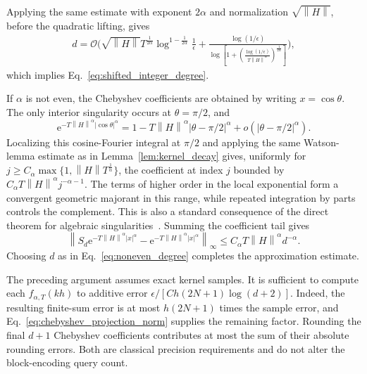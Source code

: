 \documentclass[aps,pra,reprint,floatfix,unsortedaddress,superscriptaddress]{revtex4-2}
\newcommand{\norm}[1]{\left\lVert#1\right\rVert}
\newcommand{\abs}[1]{\left\lvert#1\right\rvert}
\newcommand{\Ocal}{\mathcal{O}}
\begin{document}
Applying the same estimate with exponent $2\alpha$ and normalization
$\sqrt{\norm{H}}$, before the quadratic lifting, gives
\begin{equation}
\begin{split}
d=\Ocal\!\Bigg(
\sqrt{\norm{H}}T^{\frac{1}{2\alpha}}
\log^{1-\frac{1}{2\alpha}}\frac{1}{\epsilon}
+\frac{\log(1/\epsilon)}{
\log\!\left[
1+
\left(
\frac{\log(1/\epsilon)}{T\norm{H}^{\alpha}}
\right)^{\frac{1}{2\alpha}}
\right]}
\Bigg),
\end{split}
\label{eq:shifted_integer_degree_interpolation}
\end{equation}
which implies Eq.~\eqref{eq:shifted_integer_degree}.

If $\alpha$ is not even, the Chebyshev coefficients are obtained by
writing $x=\cos\theta$.  The only interior singularity occurs at
$\theta=\pi/2$, and
\[
    \mathrm e^{-T\norm{H}^{\alpha}
    \abs{\cos\theta}^{\alpha}}
    =
    1-T\norm{H}^{\alpha}
    \abs{\theta-\pi/2}^{\alpha}
    +o(\abs{\theta-\pi/2}^{\alpha}).
\]
Localizing this cosine-Fourier integral at $\pi/2$ and applying the
same Watson-lemma estimate as in Lemma~\ref{lem:kernel_decay} gives,
uniformly for
$j\geq C_\alpha\max\{1,\norm{H}T^{\frac{1}{\alpha}}\}$, the coefficient at index
$j$ bounded by
$C_\alpha T\norm{H}^{\alpha}j^{-\alpha-1}$.  The terms of higher order
in the local exponential form a convergent geometric majorant in this
range, while repeated integration by parts controls the complement.
This is also a standard consequence of the direct theorem for
algebraic singularities~\cite{wong2001asymptotic,
devore1993constructive,ditzian1987moduli}.  Summing the coefficient
tail gives
\begin{equation}
\norm{S_d\mathrm e^{-T\norm{H}^{\alpha}\abs{x}^{\alpha}}
-\mathrm e^{-T\norm{H}^{\alpha}\abs{x}^{\alpha}}}_\infty
\leq C_\alpha T\norm{H}^{\alpha}d^{-\alpha}.
\label{eq:noneven_chebyshev_tail}
\end{equation}
Choosing $d$ as in Eq.~\eqref{eq:noneven_degree} completes the
approximation estimate.

The preceding argument assumes exact kernel samples.  It is sufficient
to compute each $f_{\alpha,T}(kh)$ to additive error
$\epsilon/[C h(2N+1)\log(d+2)]$.  Indeed, the resulting finite-sum
error is at most $h(2N+1)$ times the sample error, and
Eq.~\eqref{eq:chebyshev_projection_norm} supplies the remaining
factor.  Rounding the final $d+1$ Chebyshev coefficients contributes
at most the sum of their absolute rounding errors.  Both are classical
precision requirements and do not alter the block-encoding query
count.
\end{document}
